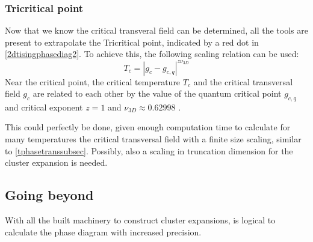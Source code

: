 \subsubsection{Tricritical point}

Now that we know the critical transveral field can be determined, all the tools are present to extrapolate the Tricritical point, indicated by a red dot in \cref{2dtisingphasediag2}. To achieve this, the following scaling relation can be used:
\begin{equation}
  T_c = \left| g_c-g_{c,q} \right|^{z \nu_{3D}}
\end{equation}
Near the critical point, the critical temperature $T_c$ and the critical transversal field $g_c$ are related to each other by the value of the quantum critical point $g_{c,q}$ and critical exponent $z=1$ and $\nu_{3D} \approx 0.62998$ \cite{Hesselmann2016}.

This could perfectly be done, given enough computation time to calculate for many temperatures the critical transversal field with a finite size scaling, similar to \cref{tphasetranssubsec}. Possibly, also a scaling in truncation dimension for the cluster expansion is needed.

\subsection{Going beyond }
With all the built machinery to construct cluster expansions, is logical to calculate the phase diagram with increased precision.

